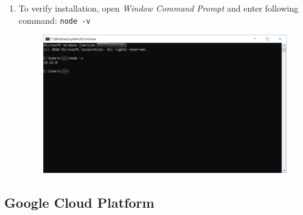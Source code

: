 \begin{enumerate}
\begin{center}
\begin{figure}[H]
	      	\end{figure}
	      \end{center}
	\item To verify installation, open \textit{Window Command Prompt} and enter following command: \verb+node -v+
	      \begin{center}
	      	\begin{figure}[H]
	      		\centering
	      		\includegraphics[width=0.6\columnwidth]{images/appendixA/Nodejs-verify-install.PNG}
	      	\end{figure}
	      \end{center}
\end{enumerate}
\tocless\subsection{Google Cloud Platform}
